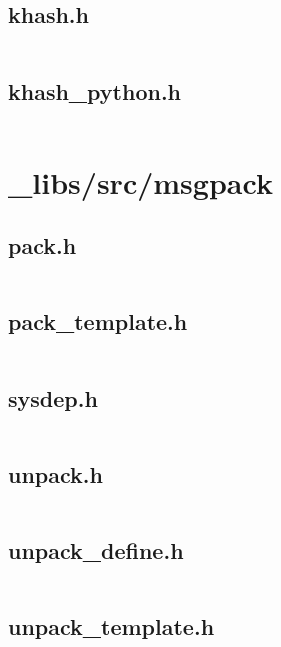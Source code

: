 \documentclass{article}
\begin{document}
\subsection{khash.h}
\inputminted{c}{/home/dufferzafar/dev/@clones/pandas/pandas/_libs/src/klib/khash.h}
\newpage

\subsection{khash\_python.h}
\inputminted{c}{/home/dufferzafar/dev/@clones/pandas/pandas/_libs/src/klib/khash_python.h}
\newpage

\section{\_libs/src/msgpack}

\subsection{pack.h}
\inputminted{c}{/home/dufferzafar/dev/@clones/pandas/pandas/_libs/src/msgpack/pack.h}
\newpage

\subsection{pack\_template.h}
\inputminted{c}{/home/dufferzafar/dev/@clones/pandas/pandas/_libs/src/msgpack/pack_template.h}
\newpage

\subsection{sysdep.h}
\inputminted{c}{/home/dufferzafar/dev/@clones/pandas/pandas/_libs/src/msgpack/sysdep.h}
\newpage

\subsection{unpack.h}
\inputminted{c}{/home/dufferzafar/dev/@clones/pandas/pandas/_libs/src/msgpack/unpack.h}
\newpage

\subsection{unpack\_define.h}
\inputminted{c}{/home/dufferzafar/dev/@clones/pandas/pandas/_libs/src/msgpack/unpack_define.h}
\newpage

\subsection{unpack\_template.h}
\inputminted{c}{/home/dufferzafar/dev/@clones/pandas/pandas/_libs/src/msgpack/unpack_template.h}
\newpage
\end{document}
